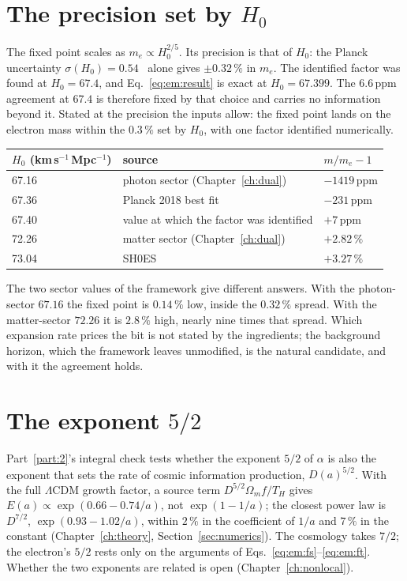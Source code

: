 \section{The precision set by $H_0$}\label{sec:em:H0}
The fixed point scales as $m_e\propto H_0^{2/5}$. Its precision is that of $H_0$: the Planck uncertainty $\sigma(H_0)=0.54$~\cite{Planck2018VI}
alone gives $\pm0.32\,\%$ in $m_e$. \calc{} The identified factor was found at $H_0=67.4$, and Eq.~\eqref{eq:em:result} is exact at $H_0=67.399$.
The 6.6\,ppm agreement at $67.4$ is therefore fixed by that choice and carries no information beyond it. \calc{} Stated at the precision the inputs
allow: the fixed point lands on the electron mass within the $0.3\,\%$ set by $H_0$, with one factor identified numerically.

\begin{center}\small\begin{tabular}{lll}\toprule
$H_0$ (km\,s$^{-1}$\,Mpc$^{-1}$) & source & $m/m_e-1$\\\midrule
67.16 & photon sector (Chapter~\ref{ch:dual}) & $-1419$\,ppm\\
67.36 & Planck 2018 best fit~\cite{Planck2018VI} & $-231$\,ppm\\
67.40 & value at which the factor was identified & $+7$\,ppm\\
72.26 & matter sector (Chapter~\ref{ch:dual}) & $+2.82\,\%$\\
73.04 & SH0ES~\cite{Riess2022} & $+3.27\,\%$\\\bottomrule
\end{tabular}\end{center}
\calc{} The two sector values of the framework give different answers. With the photon-sector $67.16$ the fixed point is $0.14\,\%$ low, inside
the $0.32\,\%$ spread. With the matter-sector $72.26$ it is $2.8\,\%$ high, nearly nine times that spread. Which expansion rate prices the bit is
not stated by the ingredients; the background horizon, which the framework leaves unmodified, is the natural candidate, and with it the
agreement holds. \openprob

\section{The exponent $5/2$}\label{sec:em:exponent}
Part~\ref{part:2}'s integral check tests whether the exponent $5/2$ of $\alpha$ is also the exponent that sets the rate of cosmic information production, $D(a)^{5/2}$. With the full $\Lambda$CDM growth factor, a source term $D^{5/2}\Omega_mf/T_H$ gives
$E(a)\propto\exp(0.66-0.74/a)$, not $\exp(1-1/a)$; the closest power law is $D^{7/2}$, $\exp(0.93-1.02/a)$, within $2\,\%$ in the coefficient of $1/a$ and $7\,\%$ in the constant
(Chapter~\ref{ch:theory}, Section~\ref{sec:numerics}). \calc{} The cosmology takes $7/2$; the electron's $5/2$ rests only on the arguments of
Eqs.~\eqref{eq:em:fs}--\eqref{eq:em:ft}. Whether the two exponents are related is open (Chapter~\ref{ch:nonlocal}). \openprob

